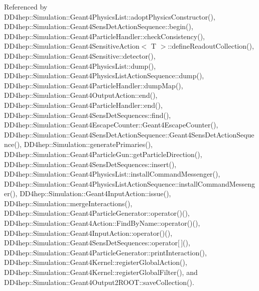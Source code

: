 Referenced by D\+D4hep\+::\+Simulation\+::\+Geant4\+Physics\+List\+::adopt\+Physics\+Constructor(), D\+D4hep\+::\+Simulation\+::\+Geant4\+Sens\+Det\+Action\+Sequence\+::begin(), D\+D4hep\+::\+Simulation\+::\+Geant4\+Particle\+Handler\+::check\+Consistency(), D\+D4hep\+::\+Simulation\+::\+Geant4\+Sensitive\+Action$<$ T $>$\+::define\+Readout\+Collection(), D\+D4hep\+::\+Simulation\+::\+Geant4\+Sensitive\+::detector(), D\+D4hep\+::\+Simulation\+::\+Geant4\+Physics\+List\+::dump(), D\+D4hep\+::\+Simulation\+::\+Geant4\+Physics\+List\+Action\+Sequence\+::dump(), D\+D4hep\+::\+Simulation\+::\+Geant4\+Particle\+Handler\+::dump\+Map(), D\+D4hep\+::\+Simulation\+::\+Geant4\+Output\+Action\+::end(), D\+D4hep\+::\+Simulation\+::\+Geant4\+Particle\+Handler\+::end(), D\+D4hep\+::\+Simulation\+::\+Geant4\+Sens\+Det\+Sequences\+::find(), D\+D4hep\+::\+Simulation\+::\+Geant4\+Escape\+Counter\+::\+Geant4\+Escape\+Counter(), D\+D4hep\+::\+Simulation\+::\+Geant4\+Sens\+Det\+Action\+Sequence\+::\+Geant4\+Sens\+Det\+Action\+Sequence(), D\+D4hep\+::\+Simulation\+::generate\+Primaries(), D\+D4hep\+::\+Simulation\+::\+Geant4\+Particle\+Gun\+::get\+Particle\+Direction(), D\+D4hep\+::\+Simulation\+::\+Geant4\+Sens\+Det\+Sequences\+::insert(), D\+D4hep\+::\+Simulation\+::\+Geant4\+Physics\+List\+::install\+Command\+Messenger(), D\+D4hep\+::\+Simulation\+::\+Geant4\+Physics\+List\+Action\+Sequence\+::install\+Command\+Messenger(), D\+D4hep\+::\+Simulation\+::\+Geant4\+Input\+Action\+::issue(), D\+D4hep\+::\+Simulation\+::merge\+Interactions(), D\+D4hep\+::\+Simulation\+::\+Geant4\+Particle\+Generator\+::operator()(), D\+D4hep\+::\+Simulation\+::\+Geant4\+Action\+::\+Find\+By\+Name\+::operator()(), D\+D4hep\+::\+Simulation\+::\+Geant4\+Input\+Action\+::operator()(), D\+D4hep\+::\+Simulation\+::\+Geant4\+Sens\+Det\+Sequences\+::operator\mbox{[}$\,$\mbox{]}(), D\+D4hep\+::\+Simulation\+::\+Geant4\+Particle\+Generator\+::print\+Interaction(), D\+D4hep\+::\+Simulation\+::\+Geant4\+Kernel\+::register\+Global\+Action(), D\+D4hep\+::\+Simulation\+::\+Geant4\+Kernel\+::register\+Global\+Filter(), and D\+D4hep\+::\+Simulation\+::\+Geant4\+Output2\+R\+O\+O\+T\+::save\+Collection().

\hypertarget{class_d_d4hep_1_1_simulation_1_1_geant4_action_a1de6421e968b3fc53cae8444c6f29b3d}{}\label{class_d_d4hep_1_1_simulation_1_1_geant4_action_a1de6421e968b3fc53cae8444c6f29b3d} 
